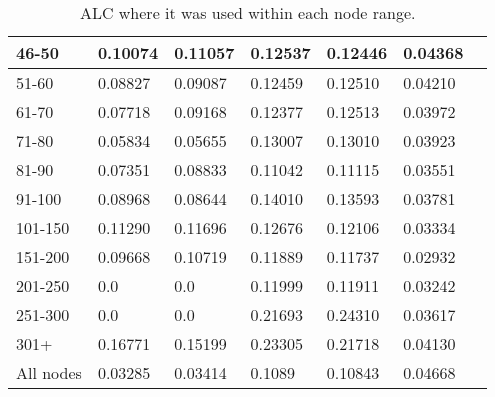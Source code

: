 \begin{table*}[h!]
\begin{tabular}{|l|l|l||l|l||l|l|}
        46-50     & 0.10074                                 & 0.11057                        & 0.12537                          & 0.12446        & 0.04368       &                \\ \hline
        51-60     & 0.08827                                 & 0.09087                        & 0.12459                          & 0.12510        & 0.04210       &                \\ \hline
        61-70     & 0.07718                                 & 0.09168                        & 0.12377                          & 0.12513        & 0.03972       &                \\ \hline
        71-80     & 0.05834                                 & 0.05655                        & 0.13007                          & 0.13010        & 0.03923       &                \\ \hline
        81-90     & 0.07351                                 & 0.08833                        & 0.11042                          & 0.11115        & 0.03551       &                \\ \hline
        91-100    & 0.08968                                 & 0.08644                        & 0.14010                          & 0.13593        & 0.03781       &                \\ \hline
        101-150   & 0.11290                                 & 0.11696                        & 0.12676                          & 0.12106        & 0.03334       &                \\ \hline
        151-200   & 0.09668                                 & 0.10719                        & 0.11889                          & 0.11737        & 0.02932       &                \\ \hline
        201-250   & 0.0                                     & 0.0                            & 0.11999                          & 0.11911        & 0.03242       &                \\ \hline
        251-300   & 0.0                                     & 0.0                            & 0.21693                          & 0.24310        & 0.03617       &                \\ \hline
        301+      & 0.16771                                 & 0.15199                        & 0.23305                          & 0.21718        & 0.04130       &                \\ \hline
        All nodes & 0.03285                                 & 0.03414                        & 0.1089                           & 0.10843        & 0.04668       &                \\ \hline
    \end{tabular}
    \caption{ALC where it was used within each node range.}
    \label{tab:BLC-degree-based-ndcg}
\end{table*}


